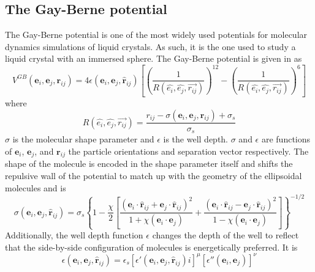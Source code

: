 \documentclass[preprint, aps]{revtex4-1}
\begin{document}
\subsection*{The Gay-Berne potential}
The Gay-Berne potential is one of the most widely used potentials for molecular 
dynamics simulations of liquid crystals. As such, it is the one used to study a
liquid crystal with an immersed sphere. The Gay-Berne potential is given in
\cite{luckhurst06} as
	\begin{equation} \label{gay-berne}
		V^{GB}(\mathbf{e}_i,\mathbf{e}_j,\mathbf{r}_{ij})
			= 4\epsilon (\mathbf{e}_i,\mathbf{e}_j,\mathbf{\hat{r}}_{ij}) 
			\left[
				\left(\frac{1}{R(\hat{e_i},\hat{e_j},\vec{r_{ij}})}\right)^{12}
				- 
				\left(\frac{1}{R(\hat{e_i},\hat{e_j},\vec{r_{ij}})}\right)^{6}
			\right]
	\end{equation}
where
	\begin{equation} \label{distance-term}
		R(\hat{e_i},\hat{e_j},\vec{r_{ij}}) = \frac{
			r_{ij} - \sigma(\mathbf{e}_i,\mathbf{e}_j,\mathbf{\hat{r}}_{ij})
			+ \sigma_s
		}
		{
			\sigma_s
		}
	\end{equation}
$\sigma$ is the molecular shape parameter and $\epsilon$ is the well depth. 
$\sigma$ and $\epsilon$ are functions of $\mathbf{e}_i$,  $\mathbf{e}_j$, and 
$\mathbf{r}_{ij}$ the particle orientations and separation vector respectively. 
The shape of the molecule is encoded in the shape parameter itself and shifts 
the repulsive wall of the potential to match up with the geometry of the
ellipsoidal molecules and is
	\begin{equation} \label{distance-function}
		\sigma(\mathbf{e}_i,\mathbf{e}_j,\mathbf{\hat{r}}_{ij})
		= \sigma_s \left\{
			1 
			- \frac{\chi}{2} \left[
				\frac{
					(\mathbf{e}_i \cdot \mathbf{\hat{r}}_{ij} 
					+ \mathbf{e}_j \cdot \mathbf{\hat{r}}_{ij})^2
				}
				{
					1 + \chi(\mathbf{e}_i\cdot\mathbf{e}_j)
				}
				+\frac{
					(\mathbf{e}_i \cdot \mathbf{\hat{r}}_{ij} 
					- \mathbf{e}_j \cdot \mathbf{\hat{r}}_{ij})^2
				}
				{
					1 - \chi(\mathbf{e}_i \cdot \mathbf{e}_j)
				}
		\right]\right\}^{-1/2}
	\end{equation}
Additionally, the well depth function $\epsilon$ changes the depth of the well 
to reflect that the side-by-side configuration of molecules is energetically 
preferred. It is 
	\begin{equation} \label{orientation-function}
		\epsilon(\mathbf{e}_i,\mathbf{e}_j,\mathbf{\hat{r}}_{ij}) 
		= \epsilon_s
			\left[	
				\epsilon'(\mathbf{e}_i,\mathbf{e}_j,\mathbf{\hat{r}}_{ij})i
			\right]^\mu
			\left[
				\epsilon''(\mathbf{e}_i,\mathbf{e}_j)
			\right]^\nu
	\end{equation}
\end{document}
